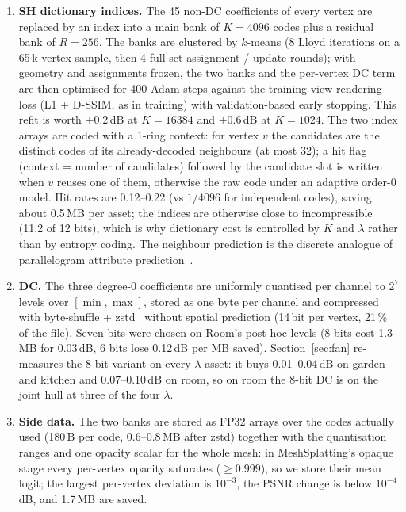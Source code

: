 \documentclass[11pt,a4paper]{article}
\begin{document}
\begin{enumerate}[nosep,leftmargin=*]
  \item \textbf{SH dictionary indices.} The 45 non-DC coefficients of every vertex are replaced by an index into a main bank of $K = 4096$ codes plus a residual bank of $R = 256$. The banks are clustered by $k$-means (8 Lloyd iterations on a 65\,k-vertex sample, then 4 full-set assignment / update rounds); with geometry and assignments frozen, the two banks and the per-vertex DC term are then optimised for 400 Adam steps against the training-view rendering loss (L1 + D-SSIM, as in training) with validation-based early stopping. This refit is worth $+0.2$\,dB at $K = 16384$ and $+0.6$\,dB at $K = 1024$. The two index arrays are coded with a 1-ring context: for vertex $v$ the candidates are the distinct codes of its already-decoded neighbours (at most 32); a hit flag (context = number of candidates) followed by the candidate slot is written when $v$ reuses one of them, otherwise the raw code under an adaptive order-0 model. Hit rates are 0.12--0.22 (vs $1/4096$ for independent codes), saving about 0.5\,MB per asset; the indices are otherwise close to incompressible (11.2 of 12 bits), which is why dictionary cost is controlled by $K$ and $\lambda$ rather than by entropy coding. The neighbour prediction is the discrete analogue of parallelogram attribute prediction~\cite{touma1998,draco}.
  \item \textbf{DC.} The three degree-0 coefficients are uniformly quantised per channel to $2^7$ levels over $[\min, \max]$, stored as one byte per channel and compressed with byte-shuffle + zstd~\cite{zstd} without spatial prediction (14\,bit per vertex, 21\,\% of the file). Seven bits were chosen on Room's post-hoc levels (8 bits cost 1.3\,MB for 0.03\,dB, 6 bits lose 0.12\,dB per MB saved). Section~\ref{sec:fan} re-measures the 8-bit variant on every $\lambda$ asset: it buys 0.01--0.04\,dB on garden and kitchen and 0.07--0.10\,dB on room, so on room the 8-bit DC is on the joint hull at three of the four $\lambda$.
  \item \textbf{Side data.} The two banks are stored as FP32 arrays over the codes actually used (180\,B per code, 0.6--0.8\,MB after zstd) together with the quantisation ranges and one opacity scalar for the whole mesh: in MeshSplatting's opaque stage every per-vertex opacity saturates ($\geq 0.999$), so we store their mean logit; the largest per-vertex deviation is $10^{-3}$, the PSNR change is below $10^{-4}$\,dB, and 1.7\,MB are saved.
\end{enumerate}
\end{document}
